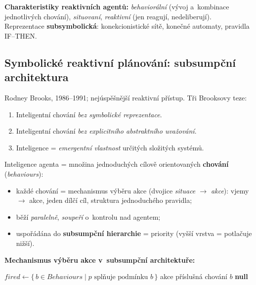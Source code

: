 \documentclass[11pt,a4paper]{article}
\theoremstyle{definition}
\begin{document}
\textbf{Charakteristiky reaktivních agentů:} \emph{behaviorální} (vývoj a~kombinace
jednotlivých chování), \emph{situovaní}, \emph{reaktivní} (jen reagují, nedeliberují).
Reprezentace \textbf{subsymbolická}: konekcionistické sítě, konečné automaty, pravidla IF--THEN.
\subsection{Symbolické reaktivní plánování: subsumpční architektura}
\label{ssec:subsumpce}

\begin{defbox}
Rodney Brooks, 1986--1991; nejúspěšnější reaktivní přístup. Tři Brooksovy teze:
\begin{enumerate}
\item Inteligentní chování \emph{bez symbolické reprezentace}.
\item Inteligentní chování \emph{bez explicitního abstraktního uvažování}.
\item Inteligence = \emph{emergentní vlastnost} určitých složitých systémů.
\end{enumerate}
Inteligence agenta = množina jednoduchých cílově orientovaných \textbf{chování}
(\emph{behaviours}):
\begin{itemize}
\item každé chování = mechanismus výběru akce (dvojice \emph{situace $\to$ akce}): vjemy
  $\to$ akce, jeden dílčí cíl, struktura jednoduchého pravidla;
\item běží \emph{paralelně}, \emph{soupeří} o~kontrolu nad agentem;
\item uspořádána do \textbf{subsumpční hierarchie} = priority (vyšší vrstva 
  = potlačuje nižší).
\end{itemize}
\end{defbox}

\noindent\textbf{Mechanismus výběru akce v~subsumpční architektuře:}
\begin{algorithmic}[1]
  \State $\mathit{fired} \gets \{\, b \in \mathit{Behaviours} \mid p \text{ splňuje podmínku } b \,\}$
      \State \Return akce příslušná chování $b$
    \EndIf
  \EndFor
  \State \Return \textbf{null} 
\EndFunction
\end{algorithmic}
\end{document}

